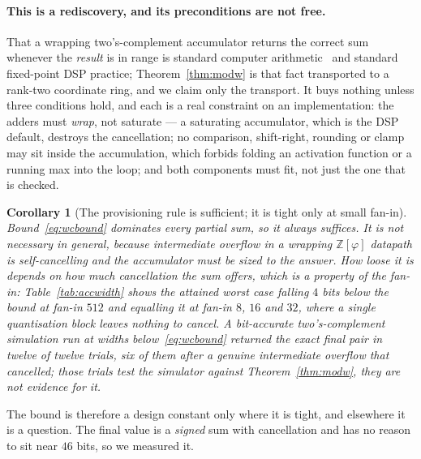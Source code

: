 \documentclass[11pt]{article}
\newtheorem{corollary}{Corollary}
\theoremstyle{definition}
\begin{document}
\paragraph{This is a rediscovery, and its preconditions are not free.} That a
wrapping two's-complement accumulator returns the correct sum whenever the
\emph{result} is in range is standard computer arithmetic~\cite[Sec.~4.3.1]{knuth2}
and standard fixed-point DSP practice; Theorem~\ref{thm:modw} is that fact
transported to a rank-two coordinate ring, and we claim only the transport. It
buys nothing unless three conditions hold, and each is a real constraint on an
implementation: the adders must \emph{wrap}, not saturate --- a saturating
accumulator, which is the DSP default, destroys the cancellation; no comparison,
shift-right, rounding or clamp may sit inside the accumulation, which forbids
folding an activation function or a running max into the loop; and both
components must fit, not just the one that is checked.

\begin{corollary}[The provisioning rule is sufficient; it is tight only at small fan-in]
\label{cor:suffnotnec}
Bound~\eqref{eq:wcbound} dominates every partial sum, so it always suffices. It
is not necessary in general, because intermediate overflow in a wrapping
$\mathbb{Z}[\varphi]$ datapath is self-cancelling and the accumulator must be
sized to the \emph{answer}. How loose it is depends on how much cancellation the
sum offers, which is a property of the fan-in: Table~\ref{tab:accwidth} shows the
attained worst case falling $4$ bits below the bound at fan-in $512$ and
\emph{equalling} it at fan-in $8$, $16$ and $32$, where a single quantisation
block leaves nothing to cancel. A bit-accurate two's-complement simulation run at
widths below~\eqref{eq:wcbound} returned the exact final pair in twelve of twelve
trials, six of them after a genuine intermediate overflow that cancelled; those
trials test the simulator against Theorem~\ref{thm:modw}, they are not evidence
for it.
\end{corollary}

The bound is therefore a design constant only where it is tight, and elsewhere it
is a question. The final value is a \emph{signed} sum with cancellation and has
no reason to sit near $46$ bits, so we measured it.
\end{document}
